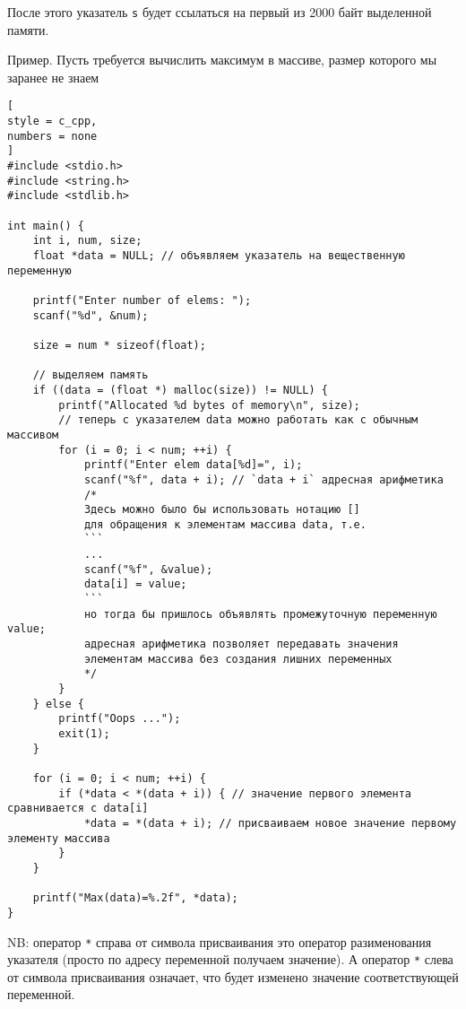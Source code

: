 \documentclass[%
	11pt,
	a4paper,
	utf8,
		]{article}
\begin{document}
После этого указатель \verb|s| будет ссылаться на первый из 2000 байт выделенной памяти.

Пример. Пусть требуется вычислить максимум в массиве, размер которого мы заранее не знаем
\begin{lstlisting}[
style = c_cpp,
numbers = none
]
#include <stdio.h>
#include <string.h>
#include <stdlib.h>

int main() {
	int i, num, size;
	float *data = NULL; // объявляем указатель на вещественную переменную
	
	printf("Enter number of elems: ");
	scanf("%d", &num);
	
	size = num * sizeof(float);
	
	// выделяем память
	if ((data = (float *) malloc(size)) != NULL) {
		printf("Allocated %d bytes of memory\n", size);
		// теперь с указателем data можно работать как с обычным массивом
		for (i = 0; i < num; ++i) {
			printf("Enter elem data[%d]=", i);
			scanf("%f", data + i); // `data + i` адресная арифметика
			/*
			Здесь можно было бы использовать нотацию []
			для обращения к элементам массива data, т.е.
			```
			...
			scanf("%f", &value);
			data[i] = value;
			```
			но тогда бы пришлось объявлять промежуточную переменную value;
			адресная арифметика позволяет передавать значения
			элементам массива без создания лишних переменных
			*/
		}
	} else {
		printf("Oops ...");
		exit(1);
	}
	
	for (i = 0; i < num; ++i) {
		if (*data < *(data + i)) { // значение первого элемента сравнивается с data[i]
			*data = *(data + i); // присваиваем новое значение первому элементу массива
		}
	}
	
	printf("Max(data)=%.2f", *data);
}
\end{lstlisting}

NB: оператор \verb|*| справа от символа присваивания это оператор разименования указателя (просто по адресу переменной получаем значение). А оператор \verb|*| слева от символа присваивания означает, что будет изменено значение соответствующей переменной.



\begin{thebibliography}{99}
\end{thebibliography}


\lstlistoflistings{}
\end{document}
